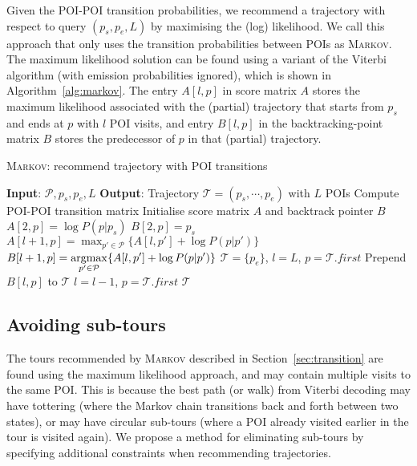 Given the POI-POI transition probabilities, we recommend a trajectory with respect to query
$(p_s, p_e, L)$ by maximising the (log) likelihood. We call this approach that only uses the
transition probabilities between POIs as \textsc{Markov}. The maximum likelihood solution
can be found using a variant of the Viterbi algorithm (with emission probabilities ignored),
which is shown in Algorithm~\ref{alg:markov}.
The entry $A[l, p]$ in score matrix $A$ stores the maximum likelihood associated with the (partial) trajectory 
that starts from $p_s$ and ends at $p$ with $l$ POI visits, 
and entry $B[l, p]$ in the backtracking-point matrix $B$ stores the predecessor of $p$ in that (partial) trajectory.

\begin{algorithm}[t]
\caption{\textsc{Markov}: recommend trajectory with POI transitions}
\label{alg:markov}
\begin{algorithmic}[1]
\STATE \textbf{Input}: $\mathcal{P}, p_s, p_e, L$
\STATE \textbf{Output}: Trajectory $\mathcal{T} = (p_s, \cdots, p_e)$ with $L$ POIs
\STATE Compute POI-POI transition matrix
\STATE Initialise score matrix $A$ and backtrack pointer $B$
    \STATE $A[2, p] = \log P(p|p_s)$
    \STATE $B[2, p] = p_s$
\ENDFOR
{}
        \STATE \(\displaystyle A[l+1, p] = \max_{p' \in \mathcal{P}} \{ A[l, p'] + \log P(p|p') \} \)
        \STATE \(\displaystyle B[l+1, p] = \operatorname*{argmax}_{p' \in \mathcal{P}} \{ A[l, p'] + \log P(p|p') \} \)
    \ENDFOR
\ENDFOR
\STATE $\mathcal{T} = \{p_e\}$, $l = L$, $p = \mathcal{T}.first$
\REPEAT
    \STATE Prepend $B[l, p]$ to $\mathcal{T}$
    \STATE $l = l - 1$, $p = \mathcal{T}.first$
\RETURN $\mathcal{T}$
\end{algorithmic}
\end{algorithm}


\subsection{Avoiding sub-tours} %
\label{sec:walkpath}

The tours recommended by \textsc{Markov} described in Section~\ref{sec:transition} are found
using the maximum likelihood approach, and may contain multiple visits to the same POI.
This is because the best path (or walk) from Viterbi decoding %
may have tottering (where the Markov chain transitions back and forth between two states),
or may have circular sub-tours (where a POI already visited earlier in the tour is
visited again).
We propose a method for eliminating sub-tours by specifying additional constraints
when recommending trajectories.

